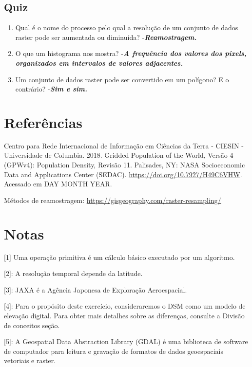 \documentclass[
]{krantz}
\providecommand{\tightlist}{%
  \setlength{\itemsep}{0pt}\setlength{\parskip}{0pt}}
\begin{document}
\hypertarget{quiz-23}{%
\subsection{Quiz}\label{quiz-23}}

\begin{enumerate}
\def\labelenumi{\arabic{enumi}.}
\tightlist
\item
  Qual é o nome do processo pelo qual a resolução de um conjunto de dados raster pode ser aumentada ou diminuída?
  -\textbf{\emph{Reamostragem.}}
\item
  O que um histograma nos mostra?
  -\textbf{\emph{A frequência dos valores dos pixels, organizados em intervalos de valores adjacentes.}}
\item
  Um conjunto de dados raster pode ser convertido em um polígono? E o contrário?
  -\textbf{\emph{Sim e sim.}}
\end{enumerate}

\hypertarget{referuxeancias}{%
\section{Referências}\label{referuxeancias}}

Centro para Rede Internacional de Informação em Ciências da Terra - CIESIN - Universidade de Columbia. 2018. Gridded Population of the World, Versão 4 (GPWv4): Population Density, Revisão 11. Palisades, NY: NASA Socioeconomic Data and Applications Center (SEDAC). \url{https://doi.org/10.7927/H49C6VHW}. Acessado em DAY MONTH YEAR.

Métodos de reamostragem: \url{https://gisgeography.com/raster-resampling/}

\hypertarget{notas}{%
\section{Notas}\label{notas}}

{[}1{]} Uma operação primitiva é um cálculo básico executado por um algoritmo.

{[}2{]}: A resolução temporal depende da latitude.

{[}3{]}: JAXA é a Agência Japonesa de Exploração Aeroespacial.

{[}4{]}: Para o propósito deste exercício, consideraremos o DSM como um modelo de elevação digital. Para obter mais detalhes sobre as diferenças, consulte a Divisão de conceitos seção.

{[}5{]}: A Geospatial Data Abstraction Library (GDAL) é uma biblioteca de software de computador para leitura e gravação de formatos de dados geoespaciais vetoriais e raster.
\end{document}
